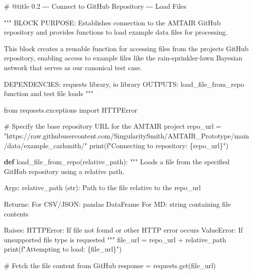\documentclass[
  11pt,
  letterpaper,
]{book}
\newenvironment{Shaded}{\begin{snugshade}}{\end{snugshade}}
\newcommand{\BuiltInTok}[1]{\textcolor[rgb]{0.00,0.23,0.31}{#1}}
\newcommand{\CommentTok}[1]{\textcolor[rgb]{0.37,0.37,0.37}{#1}}
\newcommand{\ImportTok}[1]{\textcolor[rgb]{0.00,0.46,0.62}{#1}}
\newcommand{\KeywordTok}[1]{\textcolor[rgb]{0.00,0.23,0.31}{\textbf{#1}}}
\newcommand{\NormalTok}[1]{\textcolor[rgb]{0.00,0.23,0.31}{#1}}
\newcommand{\OperatorTok}[1]{\textcolor[rgb]{0.37,0.37,0.37}{#1}}
\newcommand{\SpecialCharTok}[1]{\textcolor[rgb]{0.37,0.37,0.37}{#1}}
\newcommand{\SpecialStringTok}[1]{\textcolor[rgb]{0.13,0.47,0.30}{#1}}
\newcommand{\StringTok}[1]{\textcolor[rgb]{0.13,0.47,0.30}{#1}}
\begin{document}
\begin{Shaded}
\begin{Highlighting}[]
\CommentTok{\# @title 0.2 {-}{-}{-} Connect to GitHub Repository {-}{-}{-} Load Files}

\CommentTok{"""}
\CommentTok{BLOCK PURPOSE: Establishes connection to the AMTAIR GitHub repository and provides}
\CommentTok{functions to load example data files for processing.}

\CommentTok{This block creates a reusable function for accessing files from the project\textquotesingle{}s}
\CommentTok{GitHub repository, enabling access to example files like the rain{-}sprinkler{-}lawn}
\CommentTok{Bayesian network that serves as our canonical test case.}

\CommentTok{DEPENDENCIES: requests library, io library}
\CommentTok{OUTPUTS: load\_file\_from\_repo function and test file loads}
\CommentTok{"""}

\ImportTok{from}\NormalTok{ requests.exceptions }\ImportTok{import}\NormalTok{ HTTPError}

\CommentTok{\# Specify the base repository URL for the AMTAIR project}
\NormalTok{repo\_url }\OperatorTok{=} \StringTok{"https://raw.githubusercontent.com/SingularitySmith/AMTAIR\_Prototype/main/data/example\_carlsmith/"}
\BuiltInTok{print}\NormalTok{(}\SpecialStringTok{f"Connecting to repository: }\SpecialCharTok{\{}\NormalTok{repo\_url}\SpecialCharTok{\}}\SpecialStringTok{"}\NormalTok{)}

\KeywordTok{def}\NormalTok{ load\_file\_from\_repo(relative\_path):}
    \CommentTok{"""}
\CommentTok{    Loads a file from the specified GitHub repository using a relative path.}

\CommentTok{    Args:}
\CommentTok{        relative\_path (str): Path to the file relative to the repo\_url}

\CommentTok{    Returns:}
\CommentTok{        For CSV/JSON: pandas DataFrame}
\CommentTok{        For MD: string containing file contents}

\CommentTok{    Raises:}
\CommentTok{        HTTPError: If file not found or other HTTP error occurs}
\CommentTok{        ValueError: If unsupported file type is requested}
\CommentTok{    """}
\NormalTok{    file\_url }\OperatorTok{=}\NormalTok{ repo\_url }\OperatorTok{+}\NormalTok{ relative\_path}
    \BuiltInTok{print}\NormalTok{(}\SpecialStringTok{f"Attempting to load: }\SpecialCharTok{\{}\NormalTok{file\_url}\SpecialCharTok{\}}\SpecialStringTok{"}\NormalTok{)}

    \CommentTok{\# Fetch the file content from GitHub}
\NormalTok{    response }\OperatorTok{=}\NormalTok{ requests.get(file\_url)}


\end{Highlighting}
\end{Shaded}
\end{document}
